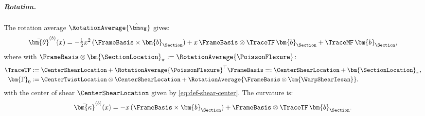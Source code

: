 \subparagraph{Rotation.}
The rotation average \(\RotationAverage{\hat{\bm u}_{\rm I\!I}}\) gives:
\begin{equation*}
\bar{\bm{\theta}}^{(b)}(x) = -\tfrac{1}{2}x^2\,(\FrameBasis \times \bm{b}_{\Section}) 
+ x\,\FrameBasis\otimes\TraceTF\,\bm{b}_{\Section} 
+ \TraceMF\,\bm{b}_{\Section},
\end{equation*}
where with \(\FrameBasis\otimes\bm{\SectionLocation}_{\pi} := \RotationAverage{\PoissonFlexure}\):
\begin{subequations}
\begin{align}
\TraceTF &:= \CenterShearLocation + \RotationAverage{\PoissonFlexure}^{\top}\FrameBasis
=: \CenterShearLocation + \bm{\SectionLocation}_{\pi}, 
\label{eq:cowper-TF} \\
%
\bm{\Gamma}_0
&:= \CenterTwistLocation \otimes \CenterShearLocation 
+ \RotationAverage{\FrameBasis \otimes \bm{\WarpShearIesan}}.
\label{eq:cowper-MF}
\end{align}
\end{subequations}
with the center of shear \(\CenterShearLocation\) given by \eqref{eq:def-shear-center}. 
The curvature is:
\begin{equation*}
\bar{\bm{\kappa}}^{(b)}(x) = -x\,(\FrameBasis \times \bm{b}_{\Section}) + \FrameBasis\otimes\TraceTF\,\bm{b}_{\Section}.
\end{equation*}


